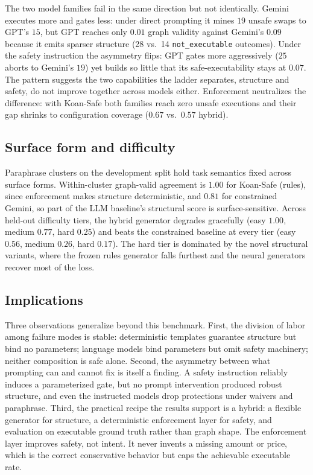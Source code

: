 The two model families fail in the same direction but not identically.
Gemini executes more and gates less: under direct prompting it mines
$19$ unsafe swaps to GPT's $15$, but GPT reaches only $0.01$ graph
validity against Gemini's $0.09$ because it emits sparser structure
(28 vs.\ 14 \texttt{not\_executable} outcomes). Under the safety
instruction the asymmetry flips: GPT gates more aggressively ($25$
aborts to Gemini's $19$) yet builds so little that its
safe-executability stays at $0.07$. The pattern suggests the two
capabilities the ladder separates, structure and safety, do not improve
together across models either. Enforcement neutralizes the difference:
with Koan-Safe both families reach zero unsafe executions and their gap
shrinks to configuration coverage ($0.67$ vs.\ $0.57$ hybrid).

\subsection{Surface form and difficulty}

Paraphrase clusters on the development split hold task semantics fixed
across surface forms. Within-cluster graph-valid agreement is $1.00$ for
Koan-Safe (rules), since enforcement makes structure deterministic, and
$0.81$ for constrained Gemini, so part of the LLM baseline's structural
score is surface-sensitive. Across held-out difficulty tiers, the hybrid
generator degrades gracefully (easy $1.00$, medium $0.77$, hard $0.25$)
and beats the constrained baseline at every tier (easy $0.56$, medium
$0.26$, hard $0.17$). The hard tier is dominated by the novel structural
variants, where the frozen rules generator falls furthest and the neural
generators recover most of the loss.

\subsection{Implications}

Three observations generalize beyond this benchmark. First, the division
of labor among failure modes is stable: deterministic templates guarantee
structure but bind no parameters; language models bind parameters but
omit safety machinery; neither composition is safe alone. Second, the
asymmetry between what prompting can and cannot fix is itself a finding.
A safety instruction reliably induces a parameterized gate, but no prompt
intervention produced robust structure, and even the instructed models
drop protections under waivers and paraphrase. Third, the practical
recipe the results support is a hybrid: a flexible generator for
structure, a deterministic enforcement layer for safety, and evaluation
on executable ground truth rather than graph shape. The enforcement layer
improves safety, not intent. It never invents a missing amount or price,
which is the correct conservative behavior but caps the achievable
executable rate.
